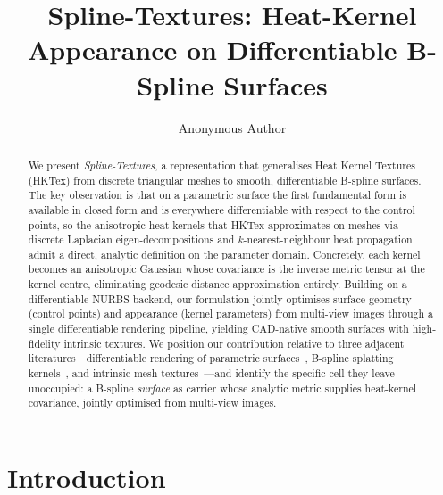 \documentclass[acmtog, review=true, authorversion=false]{acmart}
\begin{document}
\title{Spline-Textures: Heat-Kernel Appearance on Differentiable B-Spline Surfaces}

\author{Anonymous Author}

\begin{abstract}
We present \emph{Spline-Textures}, a representation that generalises Heat
Kernel Textures (HKTex) from discrete triangular meshes to smooth,
differentiable B-spline surfaces. The key observation is that on a parametric
surface the first fundamental form is available in closed form and is
everywhere differentiable with respect to the control points, so the
anisotropic heat kernels that HKTex approximates on meshes via discrete
Laplacian eigen-decompositions and $k$-nearest-neighbour heat propagation
admit a direct, analytic definition on the parameter domain. Concretely,
each kernel becomes an anisotropic Gaussian whose covariance is the inverse
metric tensor at the kernel centre, eliminating geodesic distance
approximation entirely. Building on a differentiable NURBS backend, our
formulation jointly optimises surface geometry (control points) and
appearance (kernel parameters) from multi-view images through a single
differentiable rendering pipeline, yielding CAD-native smooth surfaces with
high-fidelity intrinsic textures. We position our contribution relative to
three adjacent literatures---differentiable rendering of parametric
surfaces~\cite{worchelalexa2023}, B-spline splatting
kernels~\cite{splinesplat}, and intrinsic mesh textures~\cite{hktex}---and
identify the specific cell they leave unoccupied: a B-spline \emph{surface}
as carrier whose analytic metric supplies heat-kernel covariance, jointly
optimised from multi-view images.
\end{abstract}



\maketitle

\section{Introduction}\label{sec:intro}
\end{document}
